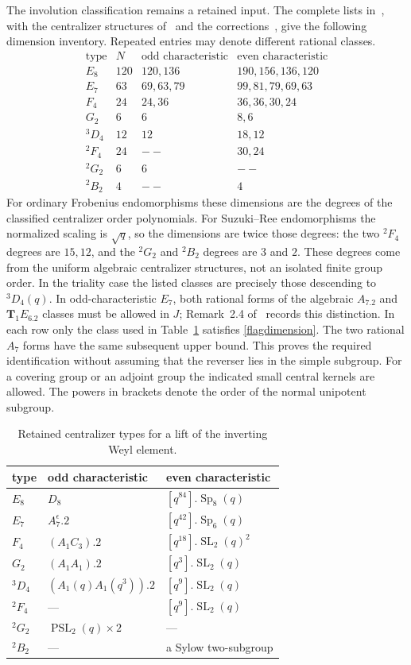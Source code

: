 \documentclass[10pt,a4paper]{article}
\newcommand{\Sp}{\operatorname{Sp}}\newcommand{\SL}{\operatorname{SL}}
\newcommand{\PSL}{\operatorname{PSL}}\newcommand{\PGL}{\operatorname{PGL}}
\begin{document}
The involution classification remains a retained input. The complete
lists in~\cite[Proposition~2.3, Table~5 and Remark~2.4]{BT}, with the
centralizer structures of~\cite[Sections~13--18]{AS} and the
corrections~\cite{ASerr}, give the following dimension inventory.
Repeated entries may denote different rational classes.
\[
\begin{array}{c|r|l|l}
\text{type}&N&\text{odd characteristic}&\text{even characteristic}\\\hline
E_8&120&120,136&190,156,136,120\\
E_7&63&69,63,79&99,81,79,69,63\\
F_4&24&24,36&36,36,30,24\\
G_2&6&6&8,6\\
{}^3D_4&12&12&18,12\\
{}^2F_4&24&--&30,24\\
{}^2G_2&6&6&--\\
{}^2B_2&4&--&4
\end{array}
\]
For ordinary Frobenius endomorphisms these dimensions are the degrees
of the classified centralizer order polynomials. For Suzuki--Ree
endomorphisms the normalized scaling is $\sqrt q$, so the dimensions
are twice those degrees: the two ${}^2F_4$ degrees are $15,12$,
and the ${}^2G_2$ and ${}^2B_2$ degrees are $3$ and $2$.
These degrees come from the uniform algebraic centralizer structures,
not an isolated finite group order. In the triality case the listed
classes are precisely those descending to ${}^3D_4(q)$.
In odd-characteristic $E_7$, both rational forms of the algebraic
$A_7.2$ and $\mathbf T_1E_6.2$ classes must be allowed in $J$;
Remark~2.4 of~\cite{BT} records this distinction.
In each row only the class used in Table~\ref{centralizers} satisfies
\eqref{flagdimension}. The two rational $A_7$ forms have the same
subsequent upper bound. This proves the required identification without
assuming that the reverser lies in the simple subgroup.
For a covering group
or an adjoint group the indicated small central kernels are allowed.
The powers in brackets denote the order of the normal unipotent subgroup.

\begin{table}[ht]\centering\small
\begin{tabular}{lll}
\toprule
type&odd characteristic&even characteristic\\\midrule
$E_8$&$D_8$&$[q^{84}].\Sp_8(q)$\\
$E_7$&$A_7^\epsilon.2$&$[q^{42}].\Sp_6(q)$\\
$F_4$&$(A_1C_3).2$&$[q^{18}].\SL_2(q)^2$\\
$G_2$&$(A_1A_1).2$&$[q^3].\SL_2(q)$\\
$ {}^3D_4$&$(A_1(q)A_1(q^3)).2$&$[q^9].\SL_2(q)$\\
$ {}^2F_4$&---&$[q^9].\SL_2(q)$\\
$ {}^2G_2$&$\PSL_2(q)\times2$&---\\
$ {}^2B_2$&---&a Sylow two-subgroup\\\bottomrule
\end{tabular}
\caption{Retained centralizer types for a lift of the inverting Weyl element.}
\label{centralizers}
\end{table}
\end{document}
